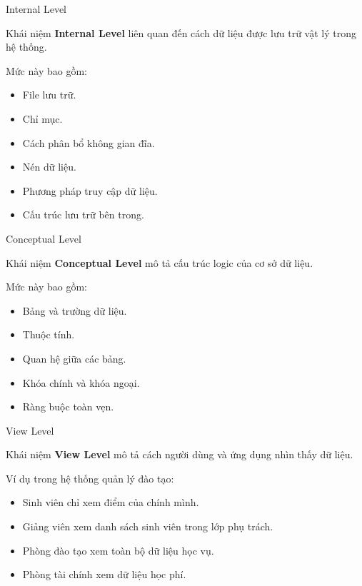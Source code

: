 \documentclass[aspectratio=169,11pt]{beamer}
\begin{document}
\begin{frame}{Internal Level}
\begin{block}{Khái niệm}
\textbf{Internal Level} liên quan đến cách dữ liệu được lưu trữ vật lý trong hệ thống.
\end{block}

Mức này bao gồm:
\begin{itemize}
  \item File lưu trữ.
  \item Chỉ mục.
  \item Cách phân bổ không gian đĩa.
  \item Nén dữ liệu.
  \item Phương pháp truy cập dữ liệu.
  \item Cấu trúc lưu trữ bên trong.
\end{itemize}
\end{frame}

\begin{frame}{Conceptual Level}
\begin{block}{Khái niệm}
\textbf{Conceptual Level} mô tả cấu trúc logic của cơ sở dữ liệu.
\end{block}

Mức này bao gồm:
\begin{itemize}
  \item Bảng và trường dữ liệu.
  \item Thuộc tính.
  \item Quan hệ giữa các bảng.
  \item Khóa chính và khóa ngoại.
  \item Ràng buộc toàn vẹn.
\end{itemize}
\end{frame}

\begin{frame}{View Level}
\begin{block}{Khái niệm}
\textbf{View Level} mô tả cách người dùng và ứng dụng nhìn thấy dữ liệu.
\end{block}

Ví dụ trong hệ thống quản lý đào tạo:
\begin{itemize}
  \item Sinh viên chỉ xem điểm của chính mình.
  \item Giảng viên xem danh sách sinh viên trong lớp phụ trách.
  \item Phòng đào tạo xem toàn bộ dữ liệu học vụ.
  \item Phòng tài chính xem dữ liệu học phí.
\end{itemize}
\end{frame}
\end{document}
